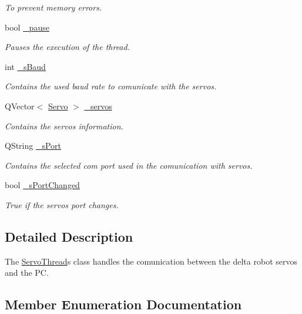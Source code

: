 \begin{DoxyCompactItemize}
\begin{DoxyCompactList}\small\item\em To prevent memory errors. \end{DoxyCompactList}\item 
bool \hyperlink{class_servo_thread_aaf2ef80e8e43518b75d20a5102970d2e}{\+\_\+pause}
\begin{DoxyCompactList}\small\item\em Pauses the execution of the thread. \end{DoxyCompactList}\item 
int \hyperlink{class_servo_thread_a5b9a41b9e271275b914affb0a845a2ee}{\+\_\+s\+Baud}
\begin{DoxyCompactList}\small\item\em Contains the used baud rate to comunicate with the servos. \end{DoxyCompactList}\item 
Q\+Vector$<$ \hyperlink{struct_servo_thread_1_1_servo}{Servo} $>$ \hyperlink{class_servo_thread_a1ac6662fe6d198b5971ae0ffa7ddfcfd}{\+\_\+servos}
\begin{DoxyCompactList}\small\item\em Contains the servos information. \end{DoxyCompactList}\item 
Q\+String \hyperlink{class_servo_thread_ac9a614aa1518efb49b0a06636bd1bdbf}{\+\_\+s\+Port}
\begin{DoxyCompactList}\small\item\em Contains the selected com port used in the comunication with servos. \end{DoxyCompactList}\item 
bool \hyperlink{class_servo_thread_a6e803432db01b10ed975132315280fd3}{\+\_\+s\+Port\+Changed}
\begin{DoxyCompactList}\small\item\em True if the servos port changes. \end{DoxyCompactList}\end{DoxyCompactItemize}


\subsection{Detailed Description}
The \hyperlink{class_servo_thread}{Servo\+Thread}\textquotesingle{}s class handles the comunication between the delta robot servos and the P\+C. 



\subsection{Member Enumeration Documentation}
\hypertarget{class_servo_thread_a8d581034e60792a9995d44065f6140a5}{}

